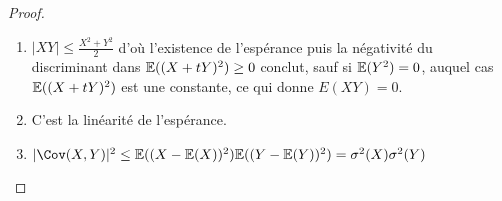 \begin{proof}~
    \begin{enumerate}
        \item $|XY|\leq \frac{X^2+Y^2}{2}$ d'où l'existence de l'espérance puis la négativité du discriminant dans $\mathbb E((X+tY)^2)\geq 0$ conclut, sauf si $\mathbb E(Y^2)=0$, auquel cas $\mathbb E((X+tY)^2)$ est une constante, ce qui donne $E(XY)=0$.
        \item C'est la linéarité de l'espérance.
        \item $|\Cov(X,Y)|^2\leq \E((X-\E(X))^2)\E((Y-\E(Y))^2)=\sigma^2(X)\sigma^2(Y)$
    \end{enumerate}
\end{proof}

